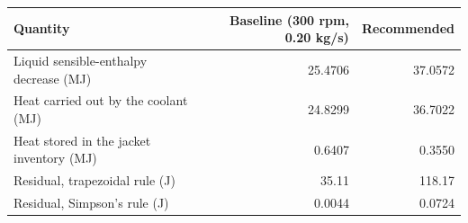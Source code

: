 \begin{tabular}{lrr}
\toprule
Quantity & Baseline (300 rpm, 0.20 kg/s) & Recommended \\
\midrule
Liquid sensible-enthalpy decrease (MJ) & 25.4706 & 37.0572 \\
Heat carried out by the coolant (MJ) & 24.8299 & 36.7022 \\
Heat stored in the jacket inventory (MJ) & 0.6407 & 0.3550 \\
Residual, trapezoidal rule (J) & 35.11 & 118.17 \\
Residual, Simpson's rule (J) & 0.0044 & 0.0724 \\
\bottomrule
\end{tabular}
